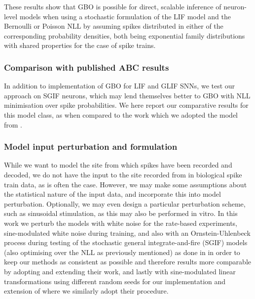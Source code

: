 \documentclass[mphil,deptreport,ianc]{infthesis} %
\begin{document}
These results show that GBO is possible for direct, scalable inference of neuron-level models when using a stochastic formulation of the LIF model and the Bernoulli or Poisson NLL by assuming spikes distributed in either of the corresponding probability densities, both being exponential family distributions with shared properties for the case of spike trains.



\subsubsection{Comparison with published ABC results}

In addition to implementation of GBO for LIF and GLIF SNNs, we test our approach on SGIF neurons, which may lend themselves better to GBO with NLL minimisation over spike probabilities. We here report our comparative results for this model class, as when compared to the work which we adopted the model from \cite{Rene2020}.

\subsubsection{Model input perturbation and formulation}

While we want to model the site from which spikes have been recorded and decoded, we do not have the input to the site recorded from in biological spike train data, as is often the case.
However, we may make some assumptions about the statistical nature of the input data, and incorporate this into model perturbation. Optionally, we may even design a particular perturbation scheme, such as sinusoidal stimulation, as this may also be performed in vitro.
In this work we perturb the models with white noise for the rate-based experiments, sine-modulated white noise during training, and also with an Ornstein-Uhlenbeck process during testing of the stochastic general integrate-and-fire (SGIF) models (also optimising over the NLL as previously mentioned) as done in \cite{Rene2020} in order to keep our methods as consistent as possible and therefore results more comparable by adopting and extending their work, and lastly with sine-modulated linear transformations using different random seeds for our implementation and extension of \cite{Huh2018} where we similarly adopt their procedure.
\end{document}
